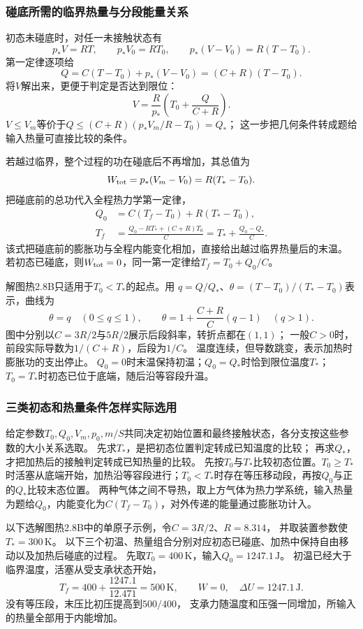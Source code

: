 \documentclass[UTF8,fontset=fandol,a4paper,11pt]{ctexart}
\begin{document}
\subsubsection*{碰底所需的临界热量与分段能量关系}
初态未碰底时，对任一未接触状态有
\[
p_*V=RT,\qquad p_*V_0=RT_0,\qquad
p_*(V-V_0)=R(T-T_0).
\]
第一定律逐项给
\[
Q=C(T-T_0)+p_*(V-V_0)=(C+R)(T-T_0).
\]
将$V$解出来，更便于判定是否达到限位：
\[
V=\frac R{p_*}\left(T_0+\frac Q{C+R}\right).
\]
$V\le V_m$等价于$Q\le(C+R)(p_*V_m/R-T_0)=Q_*$；
这一步把几何条件转成题给输入热量可直接比较的条件。

若越过临界，整个过程的功在碰底后不再增加，其总值为
\[
W_{\rm tot}=p_*(V_m-V_0)=R(T_*-T_0).
\]
把碰底前的总功代入全程热力学第一定律，
\[
\begin{aligned}
Q_0&=C(T_f-T_0)+R(T_*-T_0),\\
T_f&=\frac{Q_0-RT_*+(C+R)T_0}{C}
=T_*+\frac{Q_0-Q_*}{C}.
\end{aligned}
\]
该式把碰底前的膨胀功与全程内能变化相加，直接给出越过临界热量后的末温。
若初态已碰底，则$W_{\rm tot}=0$，同一第一定律给$T_f=T_0+Q_0/C$。

解图热2.8B只适用于$T_0<T_*$的起点。用
$q=Q/Q_*$、$\theta=(T-T_0)/(T_*-T_0)$表示，曲线为
\[
\theta=q\quad(0\le q\le1),\qquad
\theta=1+\frac{C+R}{C}(q-1)\quad(q>1).
\]
图中分别以$C=3R/2$与$5R/2$展示后段斜率，转折点都在$(1,1)$；
一般$C>0$时，前段实际导数为$1/(C+R)$，后段为$1/C$。
温度连续，但导数跳变，表示加热时膨胀功的支出停止。
$Q_0=0$时末温保持初温；$Q_0=Q_*$时恰到限位温度$T_*$；$T_0=T_*$时初态已位于底端，随后沿等容段升温。
\subsubsection*{三类初态和热量条件怎样实际选用}
给定参数$T_0,Q_0,V_m,p_0,m/S$共同决定初始位置和最终接触状态，各分支按这些参数的大小关系选取。
先求$T_*$，是把初态位置判定转成已知温度的比较；
再求$Q_*$，才把加热后的接触判定转成已知热量的比较。
先按$T_0$与$T_*$比较初态位置。$T_0\ge T_*$时活塞从底端开始，加热沿等容段进行；$T_0<T_*$时存在等压移动段，再按$Q_0$与正的$Q_*$比较末态位置。
两种气体之间不导热，取上方气体为热力学系统，输入热量为题给$Q_0$，内能变化为$C(T_f-T_0)$，对外传递的能量通过膨胀功计入。

以下选解图热2.8B中的单原子示例，令$C=3R/2$、$R=8.314$，
并取装置参数使$T_*=300\,\mathrm K$。
以下三个初温、热量组合分别对应初态已碰底、加热中保持自由移动以及加热后碰底的过程。
先取$T_0=400\,\mathrm K$，输入$Q_0=1247.1\,\mathrm J$。
初温已经大于临界温度，活塞从受支承状态开始，
\[
T_f=400+\frac{1247.1}{12.471}=500\,\mathrm K,\qquad
W=0,\quad \Delta U=1247.1\,\mathrm J.
\]
没有等压段，末压比初压提高到$500/400$，
支承力随温度和压强一同增加，所输入的热量全部用于内能增加。
\end{document}
